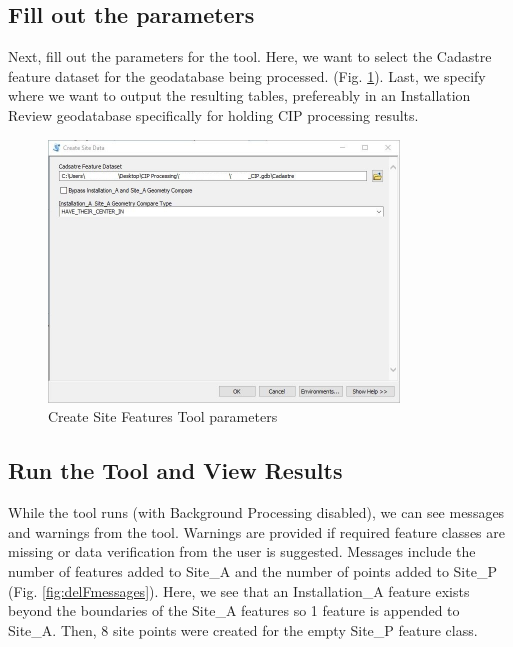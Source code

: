 \documentclass[openany]{book}
\theoremstyle{definition}
\theoremstyle{definition}
\theoremstyle{definition}
\theoremstyle{remark}
\begin{document}
\subsection{Fill out the parameters}\label{fill-out-the-parameters-1}

Next, fill out the parameters for the tool. Here, we want to select the
Cadastre feature dataset for the geodatabase being processed. (Fig.
\ref{fig:csdparams}). Last, we specify where we want to output the
resulting tables, prefereably in an Installation Review geodatabase
specifically for holding CIP processing results.\\

\begin{figure}[H]

{\centering \includegraphics[width=3.67in,]{figures/csd-params} 

}

\caption{Create Site Features Tool parameters}\label{fig:csdparams}
\end{figure}

\subsection{Run the Tool and View
Results}\label{run-the-tool-and-view-results-1}

While the tool runs (with Background Processing disabled), we can see
messages and warnings from the tool. Warnings are provided if required
feature classes are missing or data verification from the user is
suggested. Messages include the number of features added to Site\_A and
the number of points added to Site\_P (Fig. \ref{fig:delFmessages}).
Here, we see that an Installation\_A feature exists beyond the
boundaries of the Site\_A features so 1 feature is appended to Site\_A.
Then, 8 site points were created for the empty Site\_P feature class.
\end{document}

